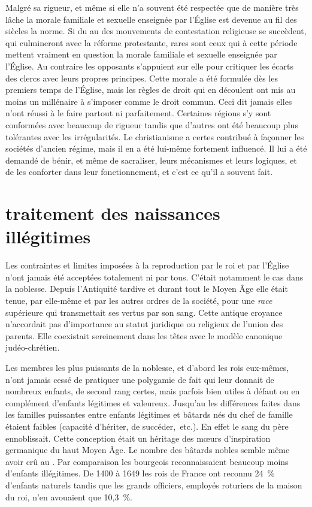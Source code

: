 Malgré sa rigueur, et même si elle n'a souvent été respectée que de manière très lâche la morale familiale et sexuelle enseignée par l'Église est devenue au fil des siècles la norme. Si du  au  des mouvements de contestation religieuse se succèdent, qui culmineront avec la réforme protestante, rares sont ceux qui à cette période mettent vraiment en question la morale familiale et sexuelle enseignée par l'Église. Au contraire les opposants s'appuient sur elle pour critiquer les écarts des clercs avec leurs propres principes. Cette morale a été formulée dès les premiers temps de l'Église, mais les règles de droit qui en découlent ont mis au moins un millénaire à s'imposer comme le droit commun. Ceci dit jamais elles n'ont réussi à le faire partout ni parfaitement. Certaines régions s'y sont conformées avec beaucoup de rigueur tandis que d'autres ont été beaucoup plus tolérantes avec les irrégularités.  Le christianisme a certes contribué à façonner les sociétés d'ancien régime, mais il en a été lui-même fortement influencé. Il lui a été demandé de bénir, et même de sacraliser, leurs mécanismes et leurs logiques, et de les conforter dans leur fonctionnement, et c'est ce qu'il a souvent fait. 




 
 
 
 
 \section{traitement des naissances illégitimes}

 Les contraintes et limites imposées à la reproduction par le roi et par l'Église n'ont jamais été acceptées totalement ni par tous. C'était notamment le cas dans la noblesse. Depuis l'Antiquité tardive et durant tout le Moyen Âge elle était tenue, par elle-même et par les autres ordres de la société, pour une \emph{race} supérieure qui transmettait ses vertus par son sang. Cette antique croyance n'accordait pas d'importance au statut juridique ou religieux de l'union des parents. Elle coexistait sereinement dans les têtes avec le modèle canonique judéo-chrétien. 

 Les membres les plus puissants de la noblesse, et d'abord les rois eux-mêmes, n'ont jamais cessé de pratiquer une polygamie de fait qui leur donnait de nombreux enfants, de second rang certes, mais parfois bien utiles à défaut ou en complément d'enfants légitimes et valeureux. Jusqu'au  les différences faites dans les familles puissantes entre enfants légitimes et bâtards nés du chef de famille étaient faibles (capacité d'hériter, de succéder,~etc.). En effet le sang du père ennoblissait. Cette conception était un héritage des mœurs d'inspiration germanique du haut Moyen Âge. Le nombre des bâtards nobles semble même avoir crû au . Par comparaison les bourgeois reconnaissaient beaucoup moins d'enfants illégitimes. De 1400 à 1649 les rois de France ont reconnu 24~\% d'enfants naturels tandis que les grands officiers, employés roturiers de la maison du roi, n'en avouaient que 10,3~\%. 

